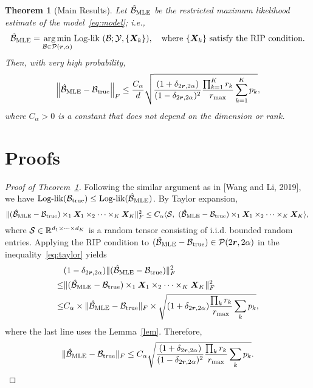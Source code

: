 \documentclass[11pt]{article}
\theoremstyle{plain}
\newtheorem{thm}{Theorem}
\theoremstyle{definition}
\begin{document}
\begin{thm} [Main Results]
\label{thm:main}
Let $\hat {\mathcal{B}}_{\text{MLE}}$ be the restricted maximum likelihood estimate of the model~\eqref{eq:model}; i.e.,
\[
\hat {\mathcal{B}}_{\text{MLE}}=\operatorname*{arg\,min}_{\mathcal{B}\in\mathcal{P}(\bm{r},\alpha)} \text{Log-lik}\ (\mathcal{B}; \mathcal{Y}, \{\bm X_k\}),\quad \text{where}\ \{\bm X_k\}\ \text{satisfy the RIP condition}.
\]
Then, with very high probability,
\[
\left\lVert\hat {\mathcal{B}}_{\text{MLE}}-\mathcal{B}_{\text{true}}\right\rVert_F\leq {C_\alpha\over d} \sqrt{ {(1+\delta_{2\bm{r},2\alpha})\over (1-\delta_{2\bm{r},2\alpha})^2}{\prod^K_{k=1} r_k\over r_{\max}} \sum^K_{k=1} p_k},
\]
where $C_\alpha>0$ is a constant that does not depend on the dimension or rank. 
\end{thm}

\section{Proofs}

\begin{proof}[Proof of Theorem~\ref{thm:main}]
Following the similar argument as in [Wang and Li, 2019], we have $\text{Log-lik}(\mathcal{B}_\text{true})\leq \text{Log-lik}(\hat {\mathcal{B}}_{\text{MLE}})$. By Taylor expansion, 
\begin{equation}\label{eq:taylor}
\lVert(\hat {\mathcal{B}}_{\text{MLE}}-\mathcal{B}_{\text{true}})\times_1 \bm X_1\times_2 \cdots\times_K \bm X_K\rVert_F^2 \leq C_\alpha\langle \mathcal{S},\ (\hat {\mathcal{B}}_{\text{MLE}}-\mathcal{B}_{\text{true}})\times_1 \bm X_1\times_2 \cdots\times_K \bm X_K \rangle ,\\
\end{equation}
where $\mathcal{S}\in\mathbb{R}^{d_1\times \cdots \times d_K}$ is a random tensor consisting of i.i.d. bounded random entries. Applying the RIP condition to $(\hat {\mathcal{B}}_{\text{MLE}}-\mathcal{B}_{\text{true}})\in\mathcal{P}(2\bm{r},2\alpha)$ in the inequality~\eqref{eq:taylor} yields
\begin{align}
&(1-\delta_{2\bm{r},2\alpha})\lVert(\hat {\mathcal{B}}_{\text{MLE}}-\mathcal{B}_{\text{true}})\rVert_F^2\\
\leq &\lVert(\hat {\mathcal{B}}_{\text{MLE}}-\mathcal{B}_{\text{true}})\times_1 \bm X_1\times_2 \cdots\times_K \bm X_K\rVert_F^2\\
\leq & C_\alpha\times \lVert\hat {\mathcal{B}}_{\text{MLE}}-\mathcal{B}_{\text{true}}\rVert_F\times \sqrt{ (1+\delta_{2\bm{r},2\alpha}) {\prod_k r_k\over r_{\max}}\sum_k p_k},
\end{align}
where the last line uses the Lemma~\ref{lem}. Therefore,
\[
\lVert\hat {\mathcal{B}}_{\text{MLE}}-\mathcal{B}_{\text{true}}\rVert_F\leq C_\alpha \sqrt{ {(1+\delta_{2\bm{r},2\alpha})\over(1-\delta_{2\bm{r},2\alpha})^2}  {\prod_k r_k \over r_{\max}} \sum_k p_k}.
\]
\end{proof}
\end{document}
